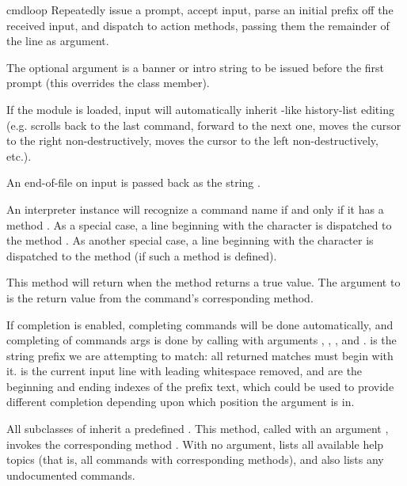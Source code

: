 \begin{methoddesc}[Cmd]{cmdloop}{}
Repeatedly issue a prompt, accept input, parse an initial prefix off
the received input, and dispatch to action methods, passing them the
remainder of the line as argument.

The optional argument is a banner or intro string to be issued before the
first prompt (this overrides the  class member).

If the  module is loaded, input will automatically
inherit -like history-list editing (e.g. 
scrolls back to the last command,  forward to the next
one,  moves the cursor to the right non-destructively,
 moves the cursor to the left non-destructively, etc.).

An end-of-file on input is passed back as the string .

An interpreter instance will recognize a command name  if
and only if it has a method .  As a special case,
a line beginning with the character  is dispatched to
the method .  As another special case, a line
beginning with the character \character{!} is dispatched to the
method  (if such a method is defined).

This method will return when the  method returns a
true value.  The  argument to  is the
return value from the command's corresponding  method.

If completion is enabled, completing commands will be done
automatically, and completing of commands args is done by calling
 with arguments , ,
, and .   is the string prefix we
are attempting to match: all returned matches must begin with it.
 is the current input line with leading whitespace removed,
 and  are the beginning and ending indexes
of the prefix text, which could be used to provide different
completion depending upon which position the argument is in.

All subclasses of  inherit a predefined .
This method, called with an argument , invokes the
corresponding method .  With no argument,
 lists all available help topics (that is, all
commands with corresponding  methods), and also lists
any undocumented commands.
\end{methoddesc}

